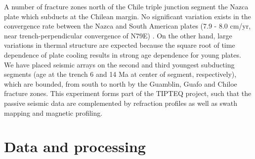 \documentclass[reviewcopy]{elsart}
\begin{document}
A number of fracture zones north of the Chile triple junction segment
the Nazca plate which subducts at the Chilean margin. No significant
variation exists in 
%
%
the convergence rate between the Nazca and South American
plates (7.9  - 8.0 cm/yr, near trench-perpendicular convergence of
N79E) \citep{demets94}. 
On the other hand, large variations in thermal structure are expected
because the square root of time dependence of plate cooling results in
strong age dependence for young plates.
We have placed seismic arrays on the second and
third youngest subducting 
segments (age at the trench 6 and 14 Ma at center of segment, respectively), which are
bounded, from south to north by the Guamblin, Guafo and Chiloe
fracture zones.  This
experiment forms part of the TIPTEQ project, such that the passive
seismic data are complemented by refraction profiles as
well as swath mapping and magnetic profiling. 

\section{Data and processing}
\end{document}

